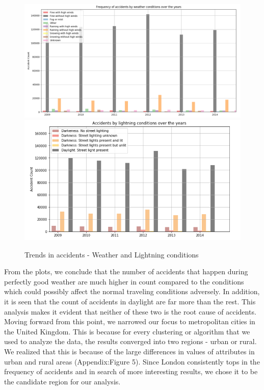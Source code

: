 \documentclass{neu_handout}
\begin{document}
\begin{figure}[!htb]
  \includegraphics[width=\linewidth]{weather-study.png}
\endminipage\hfill
{}
  \includegraphics[width=\linewidth]{lighting-study.png}
  \endminipage
\caption{Trends in accidents - Weather and Lightning conditions}  
\end{figure}

From the plots, we conclude that the number of accidents that happen during perfectly good weather are much higher in count compared to the conditions which could possibly affect the normal traveling conditions adversely. In addition, it is seen that the count of accidents in daylight are far more than the rest. This analysis makes it evident that neither of these two is the root cause of accidents. \\

Moving forward from this point, we narrowed our focus to metropolitan cities in the United Kingdom. This is because for every clustering or algorithm that we used to analyze the data, the results converged into two regions - urban or rural. We realized that this is because of the large differences in values of attributes in urban and rural areas (Appendix:Figure 5). Since London consistently  tops in the frequency of accidents and in search of more interesting results, we chose it to be the candidate region for our analysis.
\end{document}
